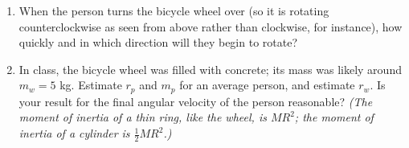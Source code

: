 \documentclass[12pt]{article}
\begin{document}
\begin{enumerate}
\begin{enumerate}
	\item When the person turns the bicycle wheel over (so it is rotating counterclockwise as seen from above rather than clockwise, for instance), how quickly and in which direction will they begin to rotate?
	
	\item In class, the bicycle wheel was filled with concrete; its mass was likely around $m_w = 5$ kg. Estimate $r_p$ and $m_p$ for an average person, and estimate $r_w$. Is your result for the final angular velocity of the person reasonable? {\it (The moment of inertia of a thin ring, like the wheel, is $MR^2$; the moment of inertia of a cylinder is $\frac{1}{2}MR^2$.)}
\end{enumerate}



\end{enumerate}
\end{document}

